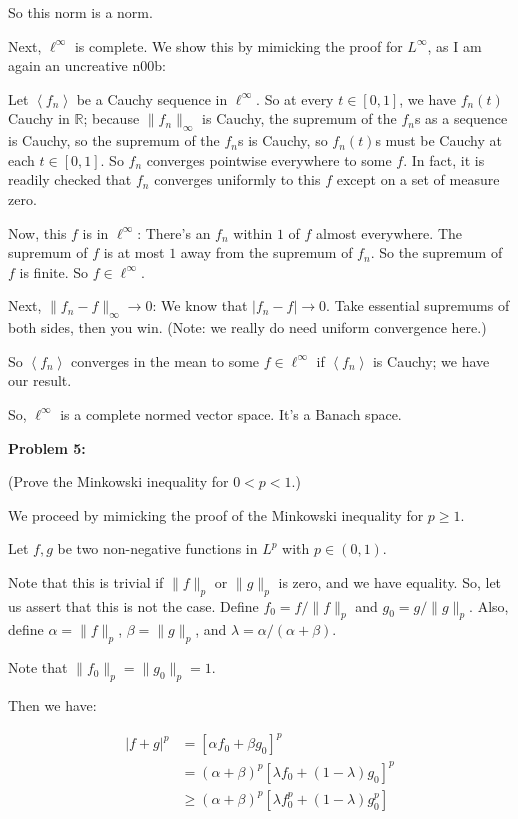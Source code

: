 \documentclass[a4paper,12pt]{article}
\newcommand{\tab}{\hspace{4mm}} %
\newcommand{\shunt}{\vspace{20mm}}
\newcommand{\absval}[1]{\left\lvert #1 \right\rvert}
\newcommand{\norm}[1]{\|#1\|}
\newcommand{\anbrack}[1]{\left\langle #1 \right\rangle}
\newcommand{\al}{\alpha} %
\newcommand{\be}{\beta}
\newcommand{\la}{\lambda}
\newcommand{\R}{\mathbb{R}}
\begin{document}
So this norm is a norm.

Next, $\ell^\infty$ is complete. We show this by mimicking the proof for $L^\infty$, as I am again an uncreative n00b:


\tab Let $\anbrack{f_n}$ be a Cauchy sequence in $\ell^\infty$. So at every $t \in [0,1]$, we have $f_n(t)$ Cauchy in $\R$; because $\norm{f_n}_\infty$ is Cauchy, the supremum of the $f_n$s as a sequence is Cauchy, so the supremum of the $f_n$s is Cauchy, so $f_n(t)$s must be Cauchy at each $t \in [0,1]$. So $f_n$ converges pointwise everywhere to some $f$. In fact, it is readily checked that $f_n$ converges uniformly to this $f$ except on a set of measure zero.

\tab Now, this $f$ is in $\ell^\infty$: There's an $f_n$ within $1$ of $f$ almost everywhere. The supremum of $f$ is at most $1$ away from the supremum of $f_n$. So the supremum of $f$ is finite. So $f \in \ell^\infty$.

\tab Next, $\norm{f_n - f}_\infty \to 0$:  We know that $\absval{f_n-f} \to 0$. Take essential supremums of both sides, then you win. (Note: we really do need uniform convergence here.)

\tab So $\anbrack{f_n}$ converges in the mean to some $f \in \ell^\infty$ if $\anbrack{f_n}$ is Cauchy; we have our result.


So, $\ell^\infty$ is a complete normed vector space. It's a Banach space.

\shunt

{\bf Problem 5:} 

(Prove the Minkowski inequality for $0 < p < 1$.)

We proceed by mimicking the proof of the Minkowski inequality for $p \geq 1$. 

Let $f,g$ be two non-negative functions in $L^p$ with $p \in (0,1)$.

Note that this is trivial if $\norm{f}_p$ or $\norm{g}_p$ is zero, and we have equality. So, let us assert that this is not the case. Define $f_0=f/\norm{f}_p$ and $g_0=g/\norm{g}_p$. Also, define $\al = \norm{f}_p$, $\be=\norm{g}_p$, and $\la = \al/(\al+\be)$.

Note that $\norm{f_0}_p=\norm{g_0}_p=1$.

Then we have:

\begin{align*}
\absval{f+g}^p &= [\al f_0 + \be g_0]^p\\
&= (\al+\be)^p[\la f_0 + (1-\la) g_0]^p\\
&\geq (\al+\be)^p[\la f_0^p + (1-\la) g_0^p]
\end{align*}
\end{document}
